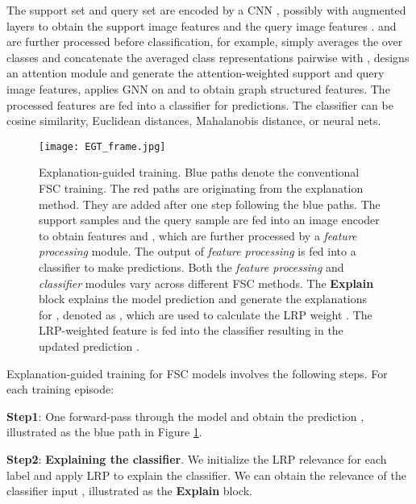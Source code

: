 \documentclass[a4paper,conference]{IEEEtran}
\begin{document}
The support set  and query set  are encoded by a CNN \cite{RN:sung2018learning, CAN:hou2019cross}, possibly with augmented layers \cite{TADAM:oreshkin2018tadam, FeaturewiseTranslayer:tseng2020cross} to obtain the support image features  and the query image features .  and  are further processed before classification, for example,  \cite{RN:sung2018learning} simply averages the  over classes and concatenate the averaged class representations pairwise with , \cite{CAN:hou2019cross} designs an attention module and generate the attention-weighted support and query image features, \cite{TPN:liu2018learning} applies GNN on  and  to obtain graph structured features. 
The processed features are fed into a classifier for predictions. The classifier can be cosine similarity\cite{CAN:hou2019cross}, Euclidean distances\cite{PROTO:snell2017prototypical}, Mahalanobis distance\cite{SIMPLECANPS:bateni2020improved}, or neural nets\cite{RN:sung2018learning, FEWGNN:garcia2018fewshot}.
\begin{figure}[tb]
    \centering
    \texttt{[image: EGT\_frame.jpg]}
    \caption{Explanation-guided training. Blue paths denote the conventional FSC training. The red paths are originating from the explanation  method. They are added after one step following the blue paths. The support samples  and the query sample  are fed into an image encoder to obtain features  and , which are further processed by a \textit{feature processing} module. The output of \textit{feature processing}  is fed into a classifier to make predictions. Both the \textit{feature processing} and \textit{classifier} modules vary across different FSC methods. The \textbf{Explain} block explains the model prediction  and generate the explanations for , denoted as , which are used to calculate the LRP weight . The LRP-weighted feature  is fed into the classifier resulting in the updated prediction .}
    \label{fig:EGT_frame}
\end{figure}

Explanation-guided training for FSC models involves the following steps. For each training episode:

\textbf{Step1}: One forward-pass through the model and obtain the prediction , illustrated as the blue path in Figure \ref{fig:EGT_frame}.

\textbf{Step2}: \textbf{Explaining the classifier}. We initialize the LRP relevance for each label and apply LRP to explain the classifier. We can obtain the relevance of the classifier input , illustrated as the \textbf{Explain} block. 
\end{document}
